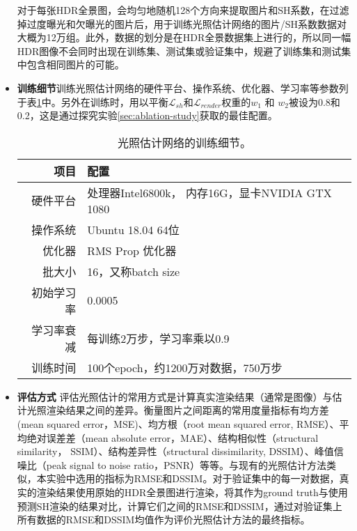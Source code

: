\begin{itemize}
    对于每张HDR全景图，会均匀地随机128个方向来提取图片和SH系数，在过滤掉过度曝光和欠曝光的图片后，用于训练光照估计网络的图片/SH系数数据对大概为12万组。此外，数据的划分是在HDR全景数据集上进行的，所以同一幅HDR图像不会同时出现在训练集、测试集或验证集中，规避了训练集和测试集中包含相同图片的可能。
    \item \textbf{训练细节}训练光照估计网络的硬件平台、操作系统、优化器、学习率等参数列于表\ref{table:traning-details}中。另外在训练时，用以平衡$\mathcal{L}_{sh}$和$\mathcal{L}_{render}$权重的$w_1$ 和 $w_2$被设为0.8和0.2，这是通过探究实验\ref{sec:ablation-study}获取的最佳配置。
    \begin{table}[htbp]
        \centering
        \begin{tabular}{r|l}
            \hline
            项目 & 配置\\
            \hline
            硬件平台 & 处理器Intel6800k， 内存16G，显卡NVIDIA GTX 1080\\
            操作系统 & Ubuntu 18.04 64位\\
            优化器    & RMS Prop 优化器\\
            批大小    & 16，又称batch size\\
            初始学习率 & 0.0005 \\
            学习率衰减 & 每训练2万步，学习率乘以0.9\\
            训练时间 & 100个epoch，约1200万对数据，750万步\\
            \hline            
        \end{tabular}
        \caption{
            \label{table:traning-details}
            光照估计网络的训练细节。
        }
    \end{table}
    \item \textbf{评估方式} 评估光照估计的常用方式是计算真实渲染结果（通常是图像）与估计光照渲染结果之间的差异。衡量图片之间距离的常用度量指标有均方差(mean squared error，MSE)、均方根（root mean squared error, RMSE）、平均绝对误差差（mean absolute  error，MAE）、结构相似性（structural similarity， SSIM）、结构差异性（structural dissimilarity, DSSIM）、峰值信噪比（peak signal to noise ratio，PSNR）等等。与现有的光照估计方法类似，本实验中选用的指标为RMSE和DSSIM。对于验证集中的每一对数据，真实的渲染结果使用原始的HDR全景图进行渲染，将其作为ground truth与使用预测SH渲染的结果对比，计算它们之间的RMSE和DSSIM，通过对验证集上所有数据的RMSE和DSSIM均值作为评价光照估计方法的最终指标。
\end{itemize}

